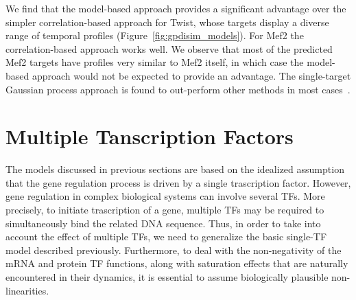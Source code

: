 \documentclass{article}
\begin{document}
We find that the model-based approach provides a significant advantage
over the simpler correlation-based approach for Twist, whose targets
display a diverse range of temporal profiles
(Figure~\ref{fig:gpdisim_models}). For Mef2 the correlation-based
approach works well. We observe that most of the predicted Mef2
targets have profiles very similar to Mef2 itself, in which case the
model-based approach would not be expected to provide an
advantage. The single-target Gaussian process approach is found to
out-perform other methods in most cases~\citep{Honkela:modelbased10}.


\section{Multiple Tanscription Factors}

The models discussed in previous sections are based on the idealized
assumption that the gene regulation process is driven by a single
trascription factor. However, gene regulation in complex biological
systems can involve several TFs.  More precisely, to initiate
trascription of a gene, multiple TFs may be required to simultaneously
bind the related DNA sequence. Thus, in order to take into account the
effect of multiple TFs, we need to generalize the basic single-TF
model described previously. Furthermore, to deal with the
non-negativity of the mRNA and protein TF functions, along with
saturation effects that are naturally encountered in their dynamics,
it is essential to assume biologically plausible non-linearities.
   
\end{document}
